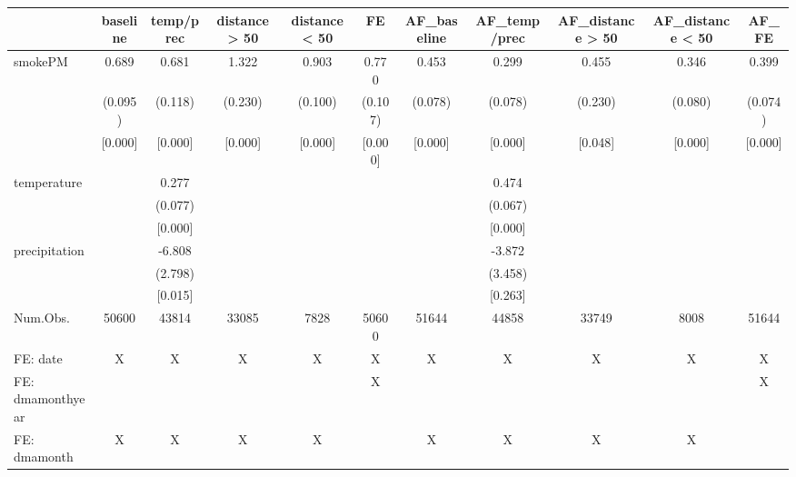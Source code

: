 \begin{table}
\centering
\begin{tabular}[t]{lcccccccccc}
\toprule
  & baseline & temp/prec & distance > 50 & distance < 50 & FE & AF\_baseline & AF\_temp/prec & AF\_distance > 50 & AF\_distance < 50 & AF\_FE\\
\midrule
smokePM & 0.689 & 0.681 & 1.322 & 0.903 & 0.770 & 0.453 & 0.299 & 0.455 & 0.346 & 0.399\\
 & (0.095) & (0.118) & (0.230) & (0.100) & (0.107) & (0.078) & (0.078) & (0.230) & (0.080) & (0.074)\\
 & {}[0.000] & {}[0.000] & {}[0.000] & {}[0.000] & {}[0.000] & {}[0.000] & {}[0.000] & {}[0.048] & {}[0.000] & {}[0.000]\\
temperature &  & 0.277 &  &  &  &  & 0.474 &  &  & \\
 &  & (0.077) &  &  &  &  & (0.067) &  &  & \\
 &  & {}[0.000] &  &  &  &  & {}[0.000] &  &  & \\
precipitation &  & -6.808 &  &  &  &  & -3.872 &  &  & \\
 &  & (2.798) &  &  &  &  & (3.458) &  &  & \\
 &  & {}[0.015] &  &  &  &  & {}[0.263] &  &  & \\
\midrule
Num.Obs. & 50600 & 43814 & 33085 & 7828 & 50600 & 51644 & 44858 & 33749 & 8008 & 51644\\
FE: date & X & X & X & X & X & X & X & X & X & X\\
FE: dmamonthyear &  &  &  &  & X &  &  &  &  & X\\
FE: dmamonth & X & X & X & X &  & X & X & X & X & \\
\bottomrule
\end{tabular}
\end{table}

